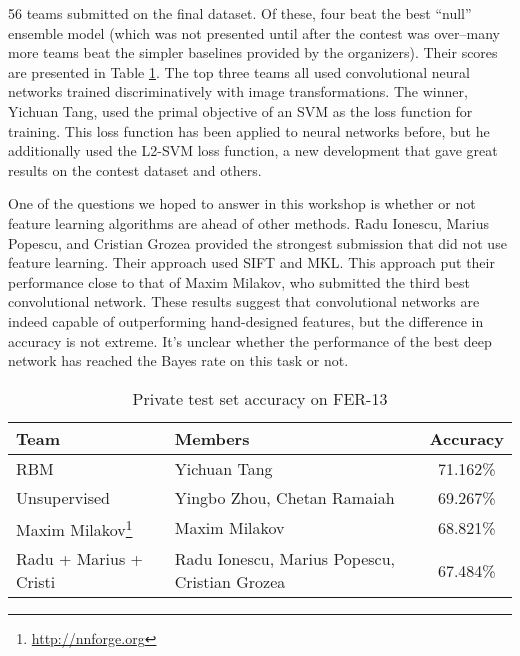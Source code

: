 \documentclass{llncs}
\begin{document}
56 teams submitted on the final dataset. Of these, four beat the best ``null'' ensemble model (which was not presented
until after the contest was over--many more teams beat the simpler baselines provided by the organizers).
Their scores are presented in Table \ref{fer-leaderboard}. The top three teams all used convolutional neural networks \citep{Fukushima80}
trained discriminatively with image transformations. The winner, Yichuan Tang, used the primal objective of an SVM
as the loss function for training. This loss function has been applied to neural networks before, but he additionally used the L2-SVM
loss function, a new development that gave great results on the contest dataset and others.

One of the questions we hoped to answer in this workshop is whether or not feature learning algorithms are ahead of other methods.
Radu Ionescu, Marius Popescu, and Cristian Grozea provided the strongest submission that did not use feature learning. Their approach
used SIFT \citep{Lowe99} and MKL. This approach put their performance close to that of Maxim Milakov, who submitted the third best convolutional network.
These results suggest that convolutional networks are indeed capable of outperforming hand-designed features, but the difference in accuracy
is not extreme. It's unclear whether the performance of the best deep network has reached the Bayes rate on this task or not.

\begin{savenotes}
\begin{table}[t]
\tiny
\caption{Private test set accuracy on FER-13}
\label{fer-leaderboard}
\vskip 0.15in
\begin{center}
\begin{small}
\begin{sc}
\begin{tabular}{p{5cm}|p{5cm}|c}
Team & Members & Accuracy \\
\hline
RBM \citep{Tang-wkshp-2013} & Yichuan Tang & 71.162\%\\
Unsupervised & Yingbo Zhou, Chetan Ramaiah & 69.267\%\\
Maxim Milakov\footnote{\url{http://nnforge.org}} & Maxim Milakov & 68.821\%\\
Radu + Marius + Cristi \citep{Ionescu-wkshp-2013} & Radu Ionescu, Marius Popescu, Cristian Grozea & 67.484\%\\
\end{tabular}
\end{sc}
\end{small}
\end{center}
\vskip -0.1in
\end{table}
\end{savenotes}
\end{document}
